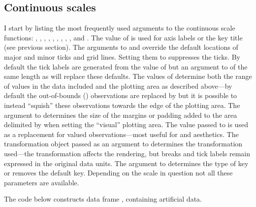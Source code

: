 \documentclass[krantz2]{krantz}\usepackage{knitr}
\begin{document}
\subsection{Continuous scales}\label{sec:plot:scales:continuous}
I start by listing the most frequently used arguments to the continuous scale functions: , , , , , , , , , and . The value of  is used for axis labels or the key title (see previous section). The arguments to  and  override the default locations of major and minor ticks and grid lines. Setting them to  suppresses the ticks. By default the tick labels are generated from the value of  but an argument to  of the same length as  will replace these defaults. The values of  determine both the range of values in the data included and the plotting area as described above---by default the out-of-bounds () observations are replaced by  but it is possible to instead ``squish'' these observations towards the edge of the plotting area. The argument to  determines the size of the margins or padding added to the area delimited by  when setting the ``visual'' plotting area. The value passed to  is used as a replacement for  valued observations---most useful for  and  aesthetics. The transformation object passed as an argument to  determines the transformation used---the transformation affects the rendering, but breaks and tick labels remain expressed in the original data units. The argument to  determines the type of key or removes the default key. Depending on the scale in question not all these parameters are available.

The code below constructs data frame , containing artificial data.

\begin{knitrout}\footnotesize
{}\color{fgcolor}\begin{kframe}
\begin{alltt}
 \hlkwb{<-}
  \hlstd{(} \hlstd{=} \hlstd{(}\hlstd{(}\hlstd{,}  \hlstd{=} \hlstd{,}  \hlstd{=} \hlstd{),}
                   \hlstd{(}\hlstd{,}  \hlstd{=} \hlstd{,}  \hlstd{=} \hlstd{)),}
              \hlstd{=} \hlstd{(}\hlstd{(}\hlstd{(}\hlstd{,} \hlstd{),} \hlstd{(}\hlstd{,} \hlstd{))),}
              \hlstd{=} \hlstd{(}\hlstd{,}  \hlstd{=} \hlstd{,}  \hlstd{=} \hlstd{))}
\end{alltt}
\end{kframe}
\end{knitrout}
\end{document}
